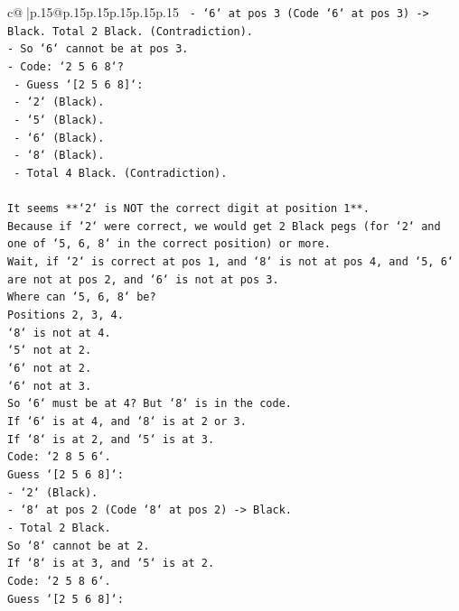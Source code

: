 \documentclass{article}
\begin{document}
{\begin{supertabular}{c@{$\;$}|p{.15\linewidth}@{}p{.15\linewidth}p{.15\linewidth}p{.15\linewidth}p{.15\linewidth}p{.15\linewidth}}
{{{\texttt{        {-} `6` at pos 3 (Code `6` at pos 3) {-}> Black. Total 2 Black. (Contradiction).} \\
\texttt{{-} So `6` cannot be at pos 3.} \\
\texttt{{-} Code: `2 5 6 8`?} \\
\texttt{    {-} Guess `{[}2 5 6 8{]}`:} \\
\texttt{        {-} `2` (Black).} \\
\texttt{        {-} `5` (Black).} \\
\texttt{        {-} `6` (Black).} \\
\texttt{        {-} `8` (Black).} \\
\texttt{        {-} Total 4 Black. (Contradiction).} \\
\\ 
\texttt{It seems **`2` is NOT the correct digit at position 1**.} \\
\texttt{Because if `2` were correct, we would get 2 Black pegs (for `2` and one of `5, 6, 8` in the correct position) or more.} \\
\texttt{Wait, if `2` is correct at pos 1, and `8` is not at pos 4, and `5, 6` are not at pos 2, and `6` is not at pos 3.} \\
\texttt{Where can `5, 6, 8` be?} \\
\texttt{Positions 2, 3, 4.} \\
\texttt{`8` is not at 4.} \\
\texttt{`5` not at 2.} \\
\texttt{`6` not at 2.} \\
\texttt{`6` not at 3.} \\
\texttt{So `6` must be at 4? But `8` is in the code.} \\
\texttt{If `6` is at 4, and `8` is at 2 or 3.} \\
\texttt{If `8` is at 2, and `5` is at 3.} \\
\texttt{Code: `2 8 5 6`.} \\
\texttt{Guess `{[}2 5 6 8{]}`:} \\
\texttt{{-} `2` (Black).} \\
\texttt{{-} `8` at pos 2 (Code `8` at pos 2) {-}> Black.} \\
\texttt{{-} Total 2 Black.} \\
\texttt{So `8` cannot be at 2.} \\
\texttt{If `8` is at 3, and `5` is at 2.} \\
\texttt{Code: `2 5 8 6`.} \\
\texttt{Guess `{[}2 5 6 8{]}`:} \\
}}}
\end{supertabular}}
\end{document}
